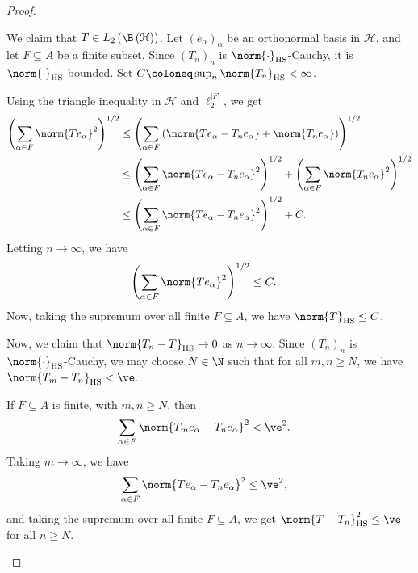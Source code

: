 \documentclass[10pt]{mypackage}
\DeclareMathOperator{\hs}{HS}
\begin{document}
\begin{proof}
\begin{enumerate}[(1)]
      We claim that $T\in L_2\left( \B\left( \mathcal{H} \right) \right)$. Let $\left( e_{\alpha} \right)_{\alpha}$ be an orthonormal basis in $\mathcal{H}$, and let $F\subseteq A$ be a finite subset. Since $\left( T_n \right)_n$ is $\norm{\cdot}_{\hs}$-Cauchy, it is $\norm{\cdot}_{\hs}$-bounded. Set $C \coloneq \sup_{n}\norm{T_n}_{\hs} < \infty$.\newline

      Using the triangle inequality in $\mathcal{H}$ and $\ell_2^{\left\vert F \right\vert}$, we get
      \begin{align*}
        \left( \sum_{\alpha \in F}\norm{Te_{\alpha}}^2 \right)^{1/2} &\leq \left( \sum_{\alpha\in F}\left( \norm{Te_{\alpha} - T_ne_{\alpha}} + \norm{T_ne_{\alpha}} \right) \right)^{1/2}\\
                                                                     &\leq \left( \sum_{\alpha\in F}\norm{Te_{\alpha} - T_ne_{\alpha}}^2 \right)^{1/2} + \left( \sum_{\alpha \in F}\norm{T_ne_{\alpha}}^2 \right)^{1/2}\\
                                                                     &\leq \left( \sum_{\alpha \in F}\norm{Te_{\alpha} - T_ne_{\alpha}}^2 \right)^{1/2} + C.
      \end{align*}
      Letting $n\rightarrow\infty$, we have
      \begin{align*}
        \left( \sum_{\alpha\in F}\norm{Te_{\alpha}}^2 \right)^{1/2} &\leq C.
      \end{align*}
      Now, taking the supremum over all finite $F\subseteq A$, we have $\norm{T}_{\hs}\leq C$.\newline

      Now, we claim that $\norm{T_n - T}_{\hs}\rightarrow 0$ as $n\rightarrow\infty$. Since $\left( T_n \right)_n$ is $\norm{\cdot}_{\hs}$-Cauchy, we may choose $N\in \N$ such that for all $m,n\geq N$, we have $\norm{T_m - T_n}_{\hs} < \ve$.\newline

      If $F\subseteq A$ is finite, with $m,n\geq N$, then
      \begin{align*}
        \sum_{\alpha \in F}\norm{T_me_{\alpha} - T_ne_{\alpha}}^2 &< \ve^2.
      \end{align*}
      Taking $m\rightarrow\infty$, we have
      \begin{align*}
        \sum_{\alpha\in F}\norm{Te_{\alpha} - T_ne_{\alpha}}^2 &\leq \ve^2,
      \end{align*}
      and taking the supremum over all finite $F\subseteq A$, we get $\norm{T - T_n}_{\hs}^2 \leq \ve$ for all $n\geq N$.
  \end{enumerate}
\end{proof}
\end{document}
